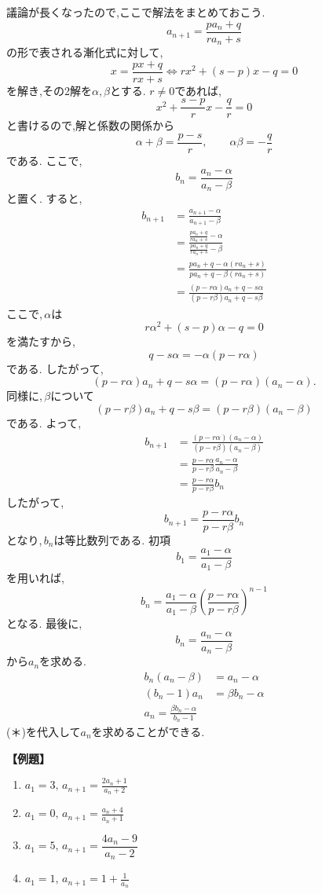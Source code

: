 議論が長くなったので,ここで解法をまとめておこう.
\[
  a_{n+1}=\frac{pa_n+q}{ra_n+s}
\]
の形で表される漸化式に対して,
\[
  x= \frac{px+q}{rx+s} \Leftrightarrow rx^2+(s-p)x-q=0
\]
を解き,その2解を$\alpha,\beta$とする.
$r\neq0$であれば,
\[
  x^2+\frac{s-p}{r}x-\frac qr=0
\]
と書けるので,解と係数の関係から
\[
  \alpha+\beta=\frac{p-s}{r},
  \qquad
  \alpha\beta=-\frac qr
\]
である.
ここで,
\[
  b_n=\frac{a_n-\alpha}{a_n-\beta}
\]
と置く.
すると,
\begin{align*}
  b_{n+1} & =\frac{a_{n+1}-\alpha}{a_{n+1}-\beta}                                                       \\
          & =\frac{\displaystyle\frac{pa_n+q}{ra_n+s}-\alpha}{\displaystyle\frac{pa_n+q}{ra_n+s}-\beta} \\
          & =\frac{pa_n+q-\alpha(ra_n+s)}{pa_n+q-\beta(ra_n+s)}                                         \\
          & =\frac{(p-r\alpha)a_n+q-s\alpha}{(p-r\beta)a_n+q-s\beta}
\end{align*}
ここで,\,$\alpha$は
\[
  r\alpha^2+(s-p)\alpha-q=0
\]
を満たすから,
\[
  q-s\alpha=-\alpha(p-r\alpha)
\]
である.
したがって,
\[
  (p-r\alpha)a_n+q-s\alpha
  =(p-r\alpha)(a_n-\alpha).
\]
同様に,\,$\beta$について
\[
  (p-r\beta)a_n+q-s\beta
  =(p-r\beta)(a_n-\beta)
\]
である.
よって,
\begin{align*}
  b_{n+1} & =\frac{(p-r\alpha)(a_n-\alpha)}{(p-r\beta)(a_n-\beta)}  \\
          & =\frac{p-r\alpha}{p-r\beta}\frac{a_n-\alpha}{a_n-\beta} \\
          & =\frac{p-r\alpha}{p-r\beta}b_n
\end{align*}
したがって,
\[
  b_{n+1}=\frac{p-r\alpha}{p-r\beta}b_n
\]
となり,\,$b_n$は等比数列である.
初項
\[
  b_1=\frac{a_1-\alpha}{a_1-\beta}
\]
を用いれば,
\[
  b_n=\frac{a_1-\alpha}{a_1-\beta}\left(\frac{p-r\alpha}{p-r\beta}\right)^{n-1} \tag{＊}
\]
となる.
最後に,
\[
  b_n=\frac{a_n-\alpha}{a_n-\beta}
\]
から$a_n$を求める.
\begin{align*}
  b_n(a_n-\beta) & =a_n-\alpha       \\
  (b_n-1)a_n     & =\beta b_n-\alpha \\
  a_n=\frac{\beta b_n-\alpha}{b_n-1}
\end{align*}
(＊)を代入して$a_n$を求めることができる.

\noindent \textbf{【例題】}
\begin{enumerate}[label=(\arabic*),parsep=3pt]
  \item $\displaystyle a_1=3,\, a_{n+1}=\frac{2a_n+1}{a_n+2}$
  \item $\displaystyle a_1=0,\, a_{n+1}=\frac{a_n+4}{a_n+1}$
  \item $\displaystyle a_1=5,\, a_{n+1}=\dfrac{4a_{n}-9}{a_{n}-2}$
  \item $\displaystyle a_1=1,\, a_{n+1}=1+\frac{1}{a_n}$
\end{enumerate}

